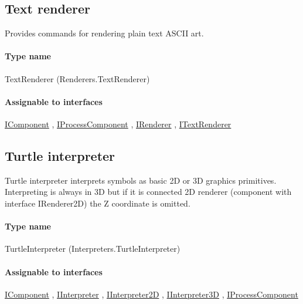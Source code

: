 

\subsection{Text renderer}
\label{Malsys.Processing.Components.Renderers.TextRenderer}
Provides commands for rendering plain text ASCII art.\paragraph{Type name}
TextRenderer (Renderers.TextRenderer) 	\paragraph{Assignable to interfaces}
		\hyperref[Malsys.Processing.Components.IComponent]{IComponent}%
, 		\hyperref[Malsys.Processing.Components.IProcessComponent]{IProcessComponent}%
, 		\hyperref[Malsys.Processing.Components.IRenderer]{IRenderer}%
, 		\hyperref[Malsys.Processing.Components.Renderers.ITextRenderer]{ITextRenderer}%
	


\subsection{Turtle interpreter}
\label{Malsys.Processing.Components.Interpreters.TurtleInterpreter}
Turtle interpreter interprets symbols as basic 2D or 3D graphics primitives.
            Interpreting is always in 3D but if it is connected 2D renderer (component with interface IRenderer2D) the Z
            coordinate is omitted.\paragraph{Type name}
TurtleInterpreter (Interpreters.TurtleInterpreter) 	\paragraph{Assignable to interfaces}
		\hyperref[Malsys.Processing.Components.IComponent]{IComponent}%
, 		\hyperref[Malsys.Processing.Components.IInterpreter]{IInterpreter}%
, 		\hyperref[Malsys.Processing.Components.Interpreters.IInterpreter2D]{IInterpreter2D}%
, 		\hyperref[Malsys.Processing.Components.Interpreters.IInterpreter3D]{IInterpreter3D}%
, 		\hyperref[Malsys.Processing.Components.IProcessComponent]{IProcessComponent}%
